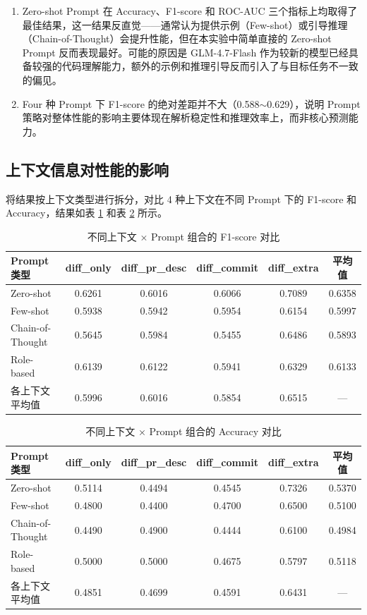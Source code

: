 \documentclass{experimentreport}
\begin{document}
{\begin{enumerate}
  \item Zero-shot Prompt 在 Accuracy、F1-score 和 ROC-AUC 三个指标上均取得了最佳结果，这一结果反直觉——通常认为提供示例（Few-shot）或引导推理（Chain-of-Thought）会提升性能，但在本实验中简单直接的 Zero-shot Prompt 反而表现最好。可能的原因是 GLM-4.7-Flash 作为较新的模型已经具备较强的代码理解能力，额外的示例和推理引导反而引入了与目标任务不一致的偏见。

  \item Four 种 Prompt 下 F1-score 的绝对差距并不大（0.588$\sim$0.629），说明 Prompt 策略对整体性能的影响主要体现在解析稳定性和推理效率上，而非核心预测能力。
\end{enumerate}

\subsection{上下文信息对性能的影响}

将结果按上下文类型进行拆分，对比 4 种上下文在不同 Prompt 下的 F1-score 和 Accuracy，结果如表 \ref{tab:merge_f1_context} 和表 \ref{tab:merge_acc_context} 所示。

\begin{table}[htbp]
  \centering
  \caption{不同上下文 × Prompt 组合的 F1-score 对比}
  \label{tab:merge_f1_context}
  \begin{tabular}{lccccc}
    \hline
    Prompt 类型 & diff\_only & diff\_pr\_desc & diff\_commit & diff\_extra & 平均值 \\
    \hline
    Zero-shot & 0.6261 & 0.6016 & 0.6066 & 0.7089 & 0.6358 \\
    Few-shot & 0.5938 & 0.5942 & 0.5954 & 0.6154 & 0.5997 \\
    Chain-of-Thought & 0.5645 & 0.5984 & 0.5455 & 0.6486 & 0.5893 \\
    Role-based & 0.6139 & 0.6122 & 0.5941 & 0.6329 & 0.6133 \\
    \hline
    各上下文平均值 & 0.5996 & 0.6016 & 0.5854 & 0.6515 & — \\
    \hline
  \end{tabular}
\end{table}

\begin{table}[htbp]
  \centering
  \caption{不同上下文 × Prompt 组合的 Accuracy 对比}
  \label{tab:merge_acc_context}
  \begin{tabular}{lccccc}
    \hline
    Prompt 类型 & diff\_only & diff\_pr\_desc & diff\_commit & diff\_extra & 平均值 \\
    \hline
    Zero-shot & 0.5114 & 0.4494 & 0.4545 & 0.7326 & 0.5370 \\
    Few-shot & 0.4800 & 0.4400 & 0.4700 & 0.6500 & 0.5100 \\
    Chain-of-Thought & 0.4490 & 0.4900 & 0.4444 & 0.6100 & 0.4984 \\
    Role-based & 0.5000 & 0.5000 & 0.4675 & 0.5797 & 0.5118 \\
    \hline
    各上下文平均值 & 0.4851 & 0.4699 & 0.4591 & 0.6431 & — \\
    \hline
  \end{tabular}
\end{table}

}
\end{document}
